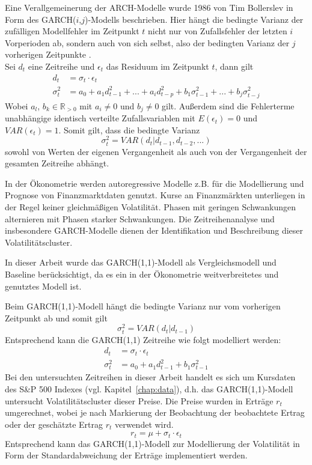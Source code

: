 \documentclass[ngerman]{ttlab-qualify}
\begin{document}
Eine Verallgemeinerung der ARCH-Modelle wurde 1986 von Tim Bollerslev in Form des GARCH($i$,$j$)-Modells beschrieben. Hier hängt die bedingte Varianz der zufälligen Modellfehler im Zeitpunkt $t$ nicht nur von Zufallsfehler der letzten $i$ Vorperioden ab, sondern auch von sich selbst, also der bedingten Varianz der $j$ vorherigen Zeitpunkte \parencite{bollerslev:1986}.\\
Sei $d_t$ eine Zeitreihe und $\epsilon_t$ das Residuum im Zeitpunkt $t$, dann gilt
\begin{align}
d_t&= \sigma_t\cdot \epsilon_t \nonumber \\
\sigma_t^2 &= a_0 + a_1d_{t-1}^2 + ... + a_id_{t-p}^2+b_1\sigma_{t-1}^2+ ... +b_j\sigma_{t-j}^2
\end{align} 
Wobei $a_l$, $b_k \in \mathbb{R}_{>0}$ mit  $a_i \neq 0$ und $b_j\neq 0$ gilt. Außerdem sind die Fehlerterme unabhängige identisch verteilte Zufallsvariablen mit $E(\epsilon_t)=0$ und $VAR(\epsilon_t)=1$. 
Somit gilt, dass die bedingte Varianz 
\[\sigma_t^2 = VAR(d_t|d_{t-1},d_{t-2},...)\]
sowohl von Werten der eigenen Vergangenheit als auch von der Vergangenheit der gesamten Zeitreihe abhängt.

In der Ökonometrie werden autoregressive Modelle z.B. für die Modellierung und Prognose von Finanzmarktdaten genutzt. Kurse an Finanzmärkten unterliegen in der Regel keiner gleichmäßigen Volatilität. Phasen mit geringen Schwankungen alternieren mit Phasen starker Schwankungen. Die Zeitreihenanalyse und insbesondere GARCH-Modelle dienen der Identifikation und Beschreibung dieser Volatilitätscluster. 

In dieser Arbeit wurde das GARCH(1,1)-Modell als Vergleichsmodell und Baseline berücksichtigt, da es ein in der Ökonometrie weitverbreitetes und genutztes Modell ist.

Beim GARCH(1,1)-Modell hängt die bedingte Varianz nur vom vorherigen Zeitpunkt ab und somit gilt 
\[\sigma_t^2 = VAR(d_t|d_{t-1})\]
Entsprechend kann die GARCH(1,1) Zeitreihe wie folgt modelliert werden:
\begin{align}
d_t &= \sigma_t\cdot \epsilon_t \nonumber \\
\sigma_t^2 &= a_0 + a_1d_{t-1}^2 + b_1\sigma_{t-1}^2
\end{align} 
Bei den untersuchten Zeitreihen in dieser Arbeit handelt es sich um Kursdaten des S\&P 500 Indexes (vgl. Kapitel~\ref{chap:data}), d.h. das GARCH(1,1)-Modell untersucht Volatilitätscluster dieser Preise. Die Preise wurden in Erträge $r_t$ umgerechnet, wobei je nach Markierung der Beobachtung der beobachtete Ertrag oder der geschätzte Ertrag $r_t$ verwendet wird.
\[r_t = \mu +\sigma_t\cdot \epsilon_t\]
Entsprechend kann das GARCH(1,1)-Modell zur Modellierung der Volatilität in Form der Standardabweichung der Erträge implementiert werden.
\end{document}
